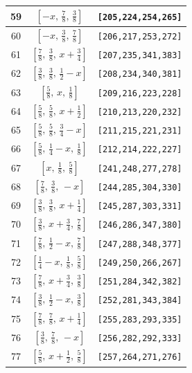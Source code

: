 \documentclass[fleqn,8pt]{jsarticle}
\begin{document}
\begin{longtable}{ccc}
59 & $\left[ - x,\, \frac{7}{8},\, \frac{3}{8} \right]$ & {\tt [205,224,254,265]} \\ \hline
60 & $\left[ - x,\, \frac{3}{8},\, \frac{7}{8} \right]$ & {\tt [206,217,253,272]} \\ \hline
61 & $\left[ \frac{7}{8},\, \frac{3}{8},\, x + \frac{3}{4} \right]$ & {\tt [207,235,341,383]} \\ \hline
62 & $\left[ \frac{3}{8},\, \frac{3}{8},\, \frac{1}{2} - x \right]$ & {\tt [208,234,340,381]} \\ \hline
63 & $\left[ \frac{5}{8},\, x,\, \frac{1}{8} \right]$ & {\tt [209,216,223,228]} \\ \hline
64 & $\left[ \frac{5}{8},\, \frac{5}{8},\, x + \frac{1}{2} \right]$ & {\tt [210,213,220,232]} \\ \hline
65 & $\left[ \frac{5}{8},\, \frac{5}{8},\, \frac{3}{4} - x \right]$ & {\tt [211,215,221,231]} \\ \hline
66 & $\left[ \frac{5}{8},\, \frac{1}{4} - x,\, \frac{1}{8} \right]$ & {\tt [212,214,222,227]} \\ \hline
67 & $\left[ x,\, \frac{1}{8},\, \frac{5}{8} \right]$ & {\tt [241,248,277,278]} \\ \hline
68 & $\left[ \frac{7}{8},\, \frac{3}{8},\, - x \right]$ & {\tt [244,285,304,330]} \\ \hline
69 & $\left[ \frac{3}{8},\, \frac{3}{8},\, x + \frac{1}{4} \right]$ & {\tt [245,287,303,331]} \\ \hline
70 & $\left[ \frac{3}{8},\, x + \frac{3}{4},\, \frac{7}{8} \right]$ & {\tt [246,286,347,380]} \\ \hline
71 & $\left[ \frac{7}{8},\, \frac{1}{2} - x,\, \frac{7}{8} \right]$ & {\tt [247,288,348,377]} \\ \hline
72 & $\left[ \frac{1}{4} - x,\, \frac{1}{8},\, \frac{5}{8} \right]$ & {\tt [249,250,266,267]} \\ \hline
73 & $\left[ \frac{7}{8},\, x + \frac{3}{4},\, \frac{3}{8} \right]$ & {\tt [251,284,342,382]} \\ \hline
74 & $\left[ \frac{3}{8},\, \frac{1}{2} - x,\, \frac{3}{8} \right]$ & {\tt [252,281,343,384]} \\ \hline
75 & $\left[ \frac{7}{8},\, \frac{7}{8},\, x + \frac{1}{4} \right]$ & {\tt [255,283,293,335]} \\ \hline
76 & $\left[ \frac{3}{8},\, \frac{7}{8},\, - x \right]$ & {\tt [256,282,292,333]} \\ \hline
77 & $\left[ \frac{5}{8},\, x + \frac{1}{2},\, \frac{5}{8} \right]$ & {\tt [257,264,271,276]} \\ \hline

\end{longtable}
\end{document}
